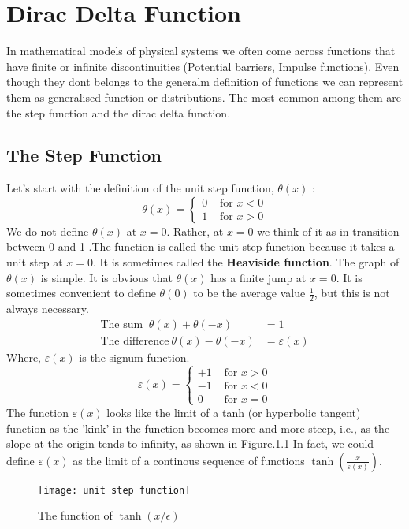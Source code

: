 \chapter{Dirac Delta Function}
In mathematical models of physical systems we often come across functions that have finite or infinite discontinuities (Potential barriers, Impulse functions). Even though they dont belongs to the generalm definition of functions we can represent them as generalised function or distributions. The most common among them are the step function and the dirac delta function.
\section{The Step Function}
Let's start with the definition of the unit step function, $\theta(x)$ :
$$
\theta(x)=\left\{\begin{array}{ll}
0 & \text { for } x<0 \\
1 & \text { for } x>0
\end{array}\right.
$$
We do not define $\theta(x)$ at $x=0$. Rather, at $x=0$ we think of it as in transition between 0 and 1 .The function is called the unit step function because it takes a unit step at $x=0$. It is sometimes called the \textbf{Heaviside function}. The graph of $\theta(x)$ is simple.
It is obvious that $\theta(x)$ has a finite jump at $x=0$. It is sometimes convenient to define $\theta(0)$ to be the average value $\frac{1}{2}$, but this is not always necessary.
\begin{align*}
\text{The sum } \ \theta(x)+\theta(-x)&=1\\
\text{The difference}\ \theta(x)-\theta(-x)&=\varepsilon(x)
\end{align*}
Where, $\varepsilon(x)$ is the signum function.
\begin{equation}
\varepsilon(x)=\left\{\begin{array}{rr}
+1 & \text { for } x>0 \\
-1 & \text { for } x<0 \\
0 & \text { for } x=0
\end{array}\right.
\end{equation} The function $\varepsilon(x)$ looks like the limit of a tanh (or hyperbolic tangent) function as the 'kink' in the function becomes more and more steep, i.e., as the slope at the origin tends to infinity, as shown in Figure.\ref{Dirac delta} In fact, we could define $\varepsilon(x)$ as the limit of a continous sequence of functions $\tanh(\frac{x}{\varepsilon(x)})$.
\begin{figure}[H]
	\centering
	\texttt{[image: unit step function]}
	\caption{The function of $ \tanh{(x/\epsilon)} $}
	\label{Dirac delta}
\end{figure}
